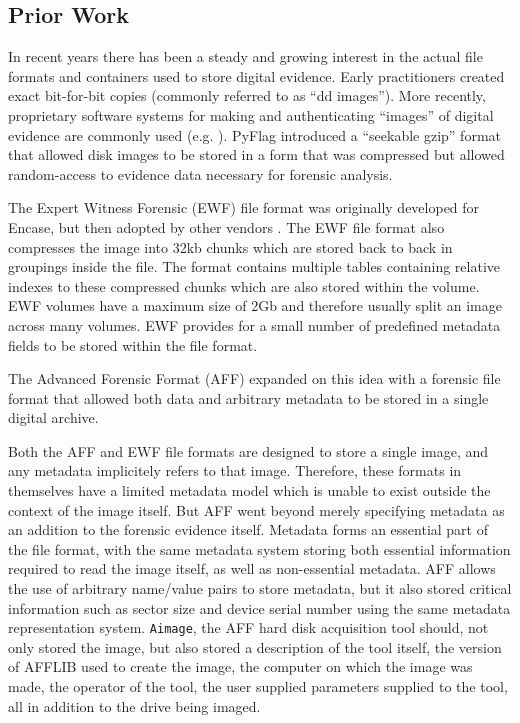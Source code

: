 \documentclass[10pt, conference]{IEEEtran}
\begin{document}
\subsection{Prior Work}
In recent years there has been a steady and growing interest in the
actual file formats and containers used to store digital
evidence. Early practitioners created exact bit-for-bit copies
(commonly referred to as ``dd images''). More recently, proprietary
software systems for making and authenticating ``images'' of digital
evidence are commonly used
(e.g. \cite{safeback,ilook,encase}). PyFlag\cite{pyflag} introduced a
``seekable gzip'' format that allowed disk images to be stored in a
form that was compressed but allowed random-access to evidence data
necessary for forensic analysis. 

The Expert Witness Forensic (EWF) file format was originally developed
for Encase\cite{encase}, but then adopted by other vendors
\cite{libewf}. The EWF file format also compresses the image into 32kb
chunks which are stored back to back in groupings inside the file. The
format contains multiple tables containing relative indexes to these
compressed chunks which are also stored within the volume. EWF volumes
have a maximum size of 2Gb and therefore usually split an image across
many volumes. EWF provides for a small number of predefined metadata
fields to be stored within the file format.

The Advanced Forensic Format (AFF) expanded on this idea with a
forensic file format that allowed both data and arbitrary metadata to
be stored in a single digital archive\cite{garfinkel:aff}. 

Both the AFF and EWF file formats are designed to store a single
image, and any metadata implicitely refers to that image. Therefore,
these formats in themselves have a limited metadata model which is
unable to exist outside the context of the image itself.
But AFF went beyond merely
specifying metadata as an addition to the forensic evidence
itself. Metadata forms an essential part of the file format, with the
same metadata system storing both essential information required to
read the image itself, as well as non-essential metadata. AFF allows
the use of arbitrary name/value pairs to store metadata, but it also
stored critical information such as sector size and device serial
number using the same metadata representation system. \verb+Aimage+,
the AFF hard  disk acquisition tool should, not only stored the image,
but also stored a description of the tool
itself, the version of AFFLIB used to create the image, the computer
on which the image was made, the operator of the tool, the user supplied parameters
supplied to the tool, all in addition to the drive being imaged.
\end{document}
